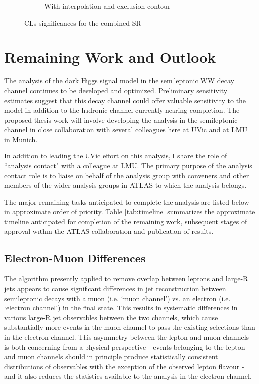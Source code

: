 \documentclass[12pt]{article}
\begin{document}
\begin{figure}[H]
\begin{subfigure}[b]{0.49\textwidth}
         \caption[]{With interpolation and exclusion contour}
         \label{fig:interp_sensitivity}
     \end{subfigure}
\caption[]{CLs significances for the combined SR}
\label{fig:sensitivity_full}
\end{figure}

\section{Remaining Work and Outlook}

The analysis of the dark Higgs signal model in the semileptonic WW decay channel continues to be developed and optimized. Preliminary sensitivity estimates suggest that this decay channel could offer valuable sensitivity to the model in addition to the hadronic channel currently nearing completion. The proposed thesis work will involve developing the analysis in the semileptonic channel in close collaboration with several colleagues here at UVic and at LMU in Munich. 

In addition to leading the UVic effort on this analysis, I share the role of ``analysis contact" with a colleague at LMU. The primary purpose of the analysis contact role is to liaise on behalf of the analysis group with conveners and other members of the wider analysis groups in ATLAS to which the analysis belongs. 

The major remaining tasks anticipated to complete the analysis are listed below in approximate order of priority. Table \ref{tab:timeline} summarizes the approximate timeline anticipated for completion of the remaining work, subsequent stages of approval within the ATLAS collaboration and publication of results. 
 
\subsection{Electron-Muon Differences}

The  algorithm presently applied to remove overlap between leptons and large-R jets appears to cause significant differences in jet reconstruction between semileptonic decays with a muon (i.e. `muon channel') vs. an electron (i.e. `electron channel') in the final state. This results in systematic differences in various large-R jet observables between the two channels, which cause substantially more events in the muon channel to pass the existing selections than in the electron channel. This asymmetry between the lepton and muon channels is both concerning from a physical perspective - events belonging to the lepton and muon channels should in principle produce statistically consistent distributions of observables with the exception of the observed lepton flavour - and it also reduces the statistics available to the analysis in the electron channel. 
\end{document}
